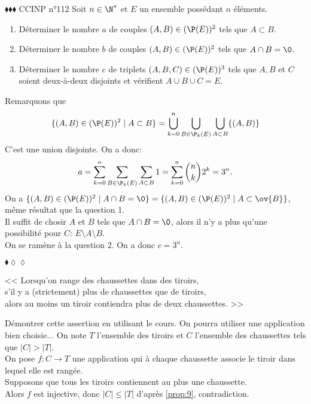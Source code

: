 \documentclass[11pt]{article}
\begin{document}
\begin{exercice}{$\blacklozenge\blacklozenge\blacklozenge$ CCINP n°112}{}
    Soit $n\in\N^*$ et $E$ un ensemble possédant $n$ éléments.
    \begin{enumerate}
        \item Déterminer le nombre $a$ de couples $(A,B)\in(\P(E))^2$ tels que $A\subset B$.
        \item Déterminer le nombre $b$ de couples $(A,B)\in(\P(E))^2$ tels que $A\cap B=\0$.
        \item Déterminer le nombre $c$ de triplets $(A,B,C)\in(\P(E))^3$ tels que $A,B$ et $C$ soient deux-à-deux disjoints et vérifient $A\cup B\cup C=E$.
    \end{enumerate}
    \tcblower
     Remarquons que
    \begin{equation*}
        \{(A,B)\in(\P(E))^2\mid A\subset B\} = \bigcup_{k=0}^n\bigcup_{B\in\P_k(E)}\bigcup_{A\subset B}\{(A,B)\}
    \end{equation*}
    C'est une union disjointe. On a donc:
    \begin{equation*}
        a=\sum_{k=0}^n\sum_{B\in\P_k(E)}\sum_{A\subset B}1=\sum_{k=0}^n\binom{n}{k}2^{k}=3^n.
    \end{equation*}
     On a $\{(A,B)\in(\P(E))^2\mid A\cap B=\0\}=\{(A,B)\in(\P(E))^2\mid A\subset\ov{B}\}$, même résultat que la question 1.\\
     Il suffit de chosir $A$ et $B$ tels que $A\cap B=\0$, alors il n'y a plus qu'une possibilité pour $C$: $E\setminus A\setminus B$.\\
    On se ramène à la question 2. On a donc $c=3^n$.
\end{exercice}

\pagebreak

\begin{exercice}{$\blacklozenge\lozenge\lozenge$}{}
    \begin{center}
        << Lorsqu'on range des chaussettes dans des tiroirs,\\
        s'il y a (strictement) plus de chaussettes que de tiroirs,\\
        alors au moins un tiroir contiendra plus de deux chaussettes. >>
    \end{center}
    Démontrer cette assertion en utilisant le cours. On pourra utiliser une application bien choisie...
    \tcblower
    On note $T$ l'ensemble des tiroirs et $C$ l'ensemble des chaussettes tels que $|C|>|T|$.\\
    On pose $f:C\to T$ une application qui à chaque chaussette associe le tiroir dans lequel elle est rangée.\\
    Supposons que tous les tiroirs contiennent au plus une chaussette.\\
    Alors $f$ est injective, donc $|C|\leq|T|$ d'après \ref{prop:9}, contradiction.
\end{exercice}
\end{document}
